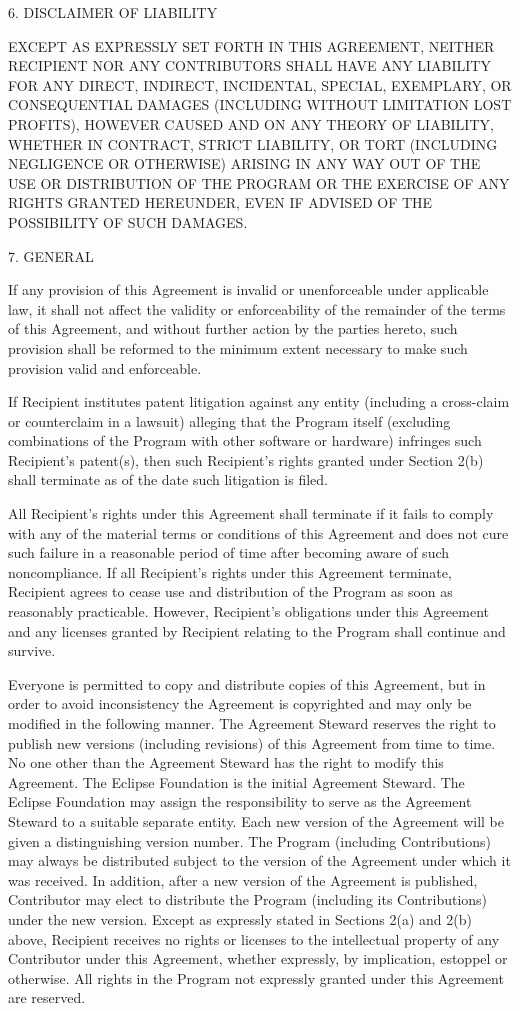 \documentclass[10pt,letterpaper,titlepage]{article}
\begin{document}
6. DISCLAIMER OF LIABILITY

EXCEPT AS EXPRESSLY SET FORTH IN THIS AGREEMENT, NEITHER RECIPIENT NOR ANY CONTRIBUTORS SHALL HAVE ANY LIABILITY FOR ANY DIRECT, INDIRECT, INCIDENTAL, SPECIAL, EXEMPLARY, OR CONSEQUENTIAL DAMAGES (INCLUDING WITHOUT LIMITATION LOST PROFITS), HOWEVER CAUSED AND ON ANY THEORY OF LIABILITY, WHETHER IN CONTRACT, STRICT LIABILITY, OR TORT (INCLUDING NEGLIGENCE OR OTHERWISE) ARISING IN ANY WAY OUT OF THE USE OR DISTRIBUTION OF THE PROGRAM OR THE EXERCISE OF ANY RIGHTS GRANTED HEREUNDER, EVEN IF ADVISED OF THE POSSIBILITY OF SUCH DAMAGES.

7. GENERAL

If any provision of this Agreement is invalid or unenforceable under applicable law, it shall not affect the validity or enforceability of the remainder of the terms of this Agreement, and without further action by the parties hereto, such provision shall be reformed to the minimum extent necessary to make such provision valid and enforceable.

If Recipient institutes patent litigation against any entity (including a cross-claim or counterclaim in a lawsuit) alleging that the Program itself (excluding combinations of the Program with other software or hardware) infringes such Recipient's patent(s), then such Recipient's rights granted under Section 2(b) shall terminate as of the date such litigation is filed.

All Recipient's rights under this Agreement shall terminate if it fails to comply with any of the material terms or conditions of this Agreement and does not cure such failure in a reasonable period of time after becoming aware of such noncompliance. If all Recipient's rights under this Agreement terminate, Recipient agrees to cease use and distribution of the Program as soon as reasonably practicable. However, Recipient's obligations under this Agreement and any licenses granted by Recipient relating to the Program shall continue and survive.

Everyone is permitted to copy and distribute copies of this Agreement, but in order to avoid inconsistency the Agreement is copyrighted and may only be modified in the following manner. The Agreement Steward reserves the right to publish new versions (including revisions) of this Agreement from time to time. No one other than the Agreement Steward has the right to modify this Agreement. The Eclipse Foundation is the initial Agreement Steward. The Eclipse Foundation may assign the responsibility to serve as the Agreement Steward to a suitable separate entity. Each new version of the Agreement will be given a distinguishing version number. The Program (including Contributions) may always be distributed subject to the version of the Agreement under which it was received. In addition, after a new version of the Agreement is published, Contributor may elect to distribute the Program (including its Contributions) under the new version. Except as expressly stated in Sections 2(a) and 2(b) above, Recipient receives no rights or licenses to the intellectual property of any Contributor under this Agreement, whether expressly, by implication, estoppel or otherwise. All rights in the Program not expressly granted under this Agreement are reserved.
\end{document}
